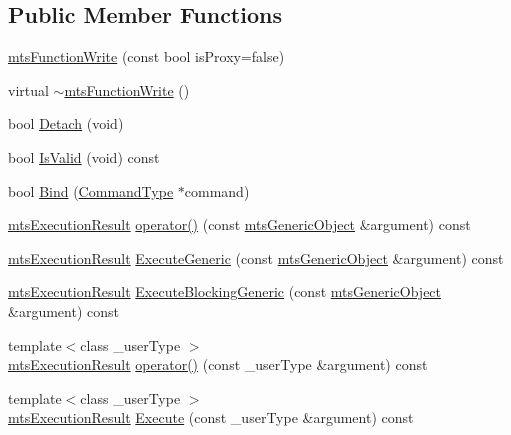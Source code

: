 \subsection*{Public Member Functions}
\begin{DoxyCompactItemize}
\item 
\hyperlink{classmts_function_write_a2c89c104fe66415fee44e7e0432c1169}{mts\-Function\-Write} (const bool is\-Proxy=false)
\item 
virtual \hyperlink{classmts_function_write_a3fa79d1d185c75ed9de6183867baf4d8}{$\sim$mts\-Function\-Write} ()
\item 
bool \hyperlink{classmts_function_write_a5d12c15fbc7bba0fb783330c5d6c69fe}{Detach} (void)
\item 
bool \hyperlink{classmts_function_write_a30285c8f7b9f5a8763b7dfa5f71e4d87}{Is\-Valid} (void) const 
\item 
bool \hyperlink{classmts_function_write_ac7a1185a062f2d9688dd7c88b1b85f35}{Bind} (\hyperlink{classmts_function_write_a4b81286be87adec18b358ebaa9ebb2be}{Command\-Type} $\ast$command)
\item 
\hyperlink{classmts_execution_result}{mts\-Execution\-Result} \hyperlink{classmts_function_write_ab60d432bb548395daa6d5d507a862ea1}{operator()} (const \hyperlink{classmts_generic_object}{mts\-Generic\-Object} \&argument) const 
\item 
\hyperlink{classmts_execution_result}{mts\-Execution\-Result} \hyperlink{classmts_function_write_a982352c95740e327e802c06dc3c9e4cf}{Execute\-Generic} (const \hyperlink{classmts_generic_object}{mts\-Generic\-Object} \&argument) const 
\item 
\hyperlink{classmts_execution_result}{mts\-Execution\-Result} \hyperlink{classmts_function_write_ab6c1d3a03e3fe06527da35598f660524}{Execute\-Blocking\-Generic} (const \hyperlink{classmts_generic_object}{mts\-Generic\-Object} \&argument) const 
\item 
{\footnotesize template$<$class \-\_\-user\-Type $>$ }\\\hyperlink{classmts_execution_result}{mts\-Execution\-Result} \hyperlink{classmts_function_write_af52b6e7e9c1b0a2f04574da77b478d2f}{operator()} (const \-\_\-user\-Type \&argument) const 
\item 
{\footnotesize template$<$class \-\_\-user\-Type $>$ }\\\hyperlink{classmts_execution_result}{mts\-Execution\-Result} \hyperlink{classmts_function_write_a79f0bfa0e2cf1d96aa93bf4876406437}{Execute} (const \-\_\-user\-Type \&argument) const 

\end{DoxyCompactItemize}
